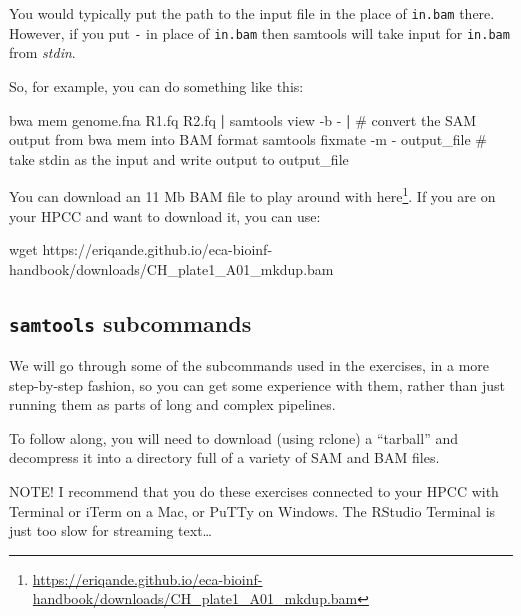 \documentclass[]{krantz}
\makeatletter
\newenvironment{Shaded}{\begin{snugshade}}{\end{snugshade}}
\newcommand{\ExtensionTok}[1]{#1}
\newcommand{\FunctionTok}[1]{\textcolor[rgb]{0,0,0}{#1}}
\newcommand{\KeywordTok}[1]{\textcolor[rgb]{0.27,0.27,0.27}{\textbf{#1}}}
\newcommand{\NormalTok}[1]{#1}
\renewcommand{\href}[2]{#2\footnote{\url{#1}}}
\newenvironment{kframe}{%
\medskip{}
\setlength{\fboxsep}{.8em}
 \def\at@end@of@kframe{}%
 \ifinner\ifhmode%
  \def\at@end@of@kframe{\end{minipage}}%
  \begin{minipage}{\columnwidth}%
 \fi\fi%
 \def\FrameCommand##1{\hskip\@totalleftmargin \hskip-\fboxsep
 \colorbox{shadecolor}{##1}\hskip-\fboxsep
     \hskip-\linewidth \hskip-\@totalleftmargin \hskip\columnwidth}%
 \MakeFramed {\advance\hsize-\width
   \@totalleftmargin\z@ \linewidth\hsize
   \@setminipage}}%
 {\par\unskip\endMakeFramed%
 \at@end@of@kframe}
\renewenvironment{Shaded}{\begin{kframe}}{\end{kframe}}
\makeatother
\begin{document}
You would typically put the path to the input file in the place of \texttt{in.bam} there.
However, if you put \texttt{-} in place of \texttt{in.bam} then samtools will take input for
\texttt{in.bam} from \emph{stdin}.

So, for example, you can do something like this:

\begin{Shaded}
\begin{Highlighting}[]
\ExtensionTok{bwa}\NormalTok{ mem genome.fna R1.fq R2.fq }\KeywordTok{|}
  \ExtensionTok{samtools}\NormalTok{ view -b -  }\KeywordTok{|}\NormalTok{   # }\ExtensionTok{convert}\NormalTok{ the SAM output from bwa mem into BAM format}
  \ExtensionTok{samtools}\NormalTok{ fixmate -m - output_file  # take stdin as the input and write output to output_file}
\end{Highlighting}
\end{Shaded}

You can download an 11 Mb BAM file to play around with \href{https://eriqande.github.io/eca-bioinf-handbook/downloads/CH_plate1_A01_mkdup.bam}{here}.
If you are on your HPCC and want to download it, you can use:

\begin{Shaded}
\begin{Highlighting}[]
\FunctionTok{wget}\NormalTok{ https://eriqande.github.io/eca-bioinf-handbook/downloads/CH_plate1_A01_mkdup.bam}
\end{Highlighting}
\end{Shaded}

\hypertarget{samtools-subcommands}{%
\subsection{\texorpdfstring{\texttt{samtools} subcommands}{samtools subcommands}}\label{samtools-subcommands}}

We will go through some of the subcommands used in the exercises, in a
more step-by-step fashion, so you can get some experience with them, rather
than just running them as parts of long and complex pipelines.

To follow along, you will need to download (using rclone) a ``tarball'' and decompress it
into a directory full of a variety of SAM and BAM files.

NOTE! I recommend that you do these exercises connected to your HPCC with Terminal or
iTerm on a Mac, or PuTTy on Windows. The RStudio Terminal is just too slow for streaming
text\ldots{}
\end{document}
